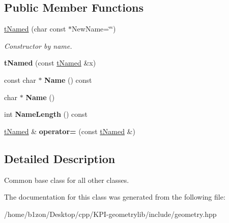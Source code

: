\subsection*{Public Member Functions}
\begin{DoxyCompactItemize}
\item 
\mbox{\label{classtNamed_a05e5161fa4d6de5530a35aebe379f99c}} 
\hyperlink{classtNamed_a05e5161fa4d6de5530a35aebe379f99c}{t\+Named} (char const $\ast$New\+Name=\char`\"{}\char`\"{})
\begin{DoxyCompactList}\small\item\em Constructor by name. \end{DoxyCompactList}\item 
\mbox{\label{classtNamed_ab5f18adfba945ef9711b442680e7e613}} 
{\bfseries t\+Named} (const \hyperlink{classtNamed}{t\+Named} \&x)
\item 
\mbox{\label{classtNamed_a8e159dc56389dad5e13d08097b1db3de}} 
const char $\ast$ {\bfseries Name} () const
\item 
\mbox{\label{classtNamed_a4ee0439b245fb018e39c3b3dd7e52d47}} 
char $\ast$ {\bfseries Name} ()
\item 
\mbox{\label{classtNamed_a0f9ee5b68f19ab435fcdd263dd31c27f}} 
int {\bfseries Name\+Length} () const
\item 
\mbox{\label{classtNamed_a2cf8d7ca50e915fc1594b6a161f9334b}} 
\hyperlink{classtNamed}{t\+Named} \& {\bfseries operator=} (const \hyperlink{classtNamed}{t\+Named} \&)
\end{DoxyCompactItemize}


\subsection{Detailed Description}
Common base class for all other classes. 

The documentation for this class was generated from the following file\+:\begin{DoxyCompactItemize}
\item 
/home/b1zon/\+Desktop/cpp/\+K\+P\+I-\/geometrylib/include/geometry.\+hpp\end{DoxyCompactItemize}

